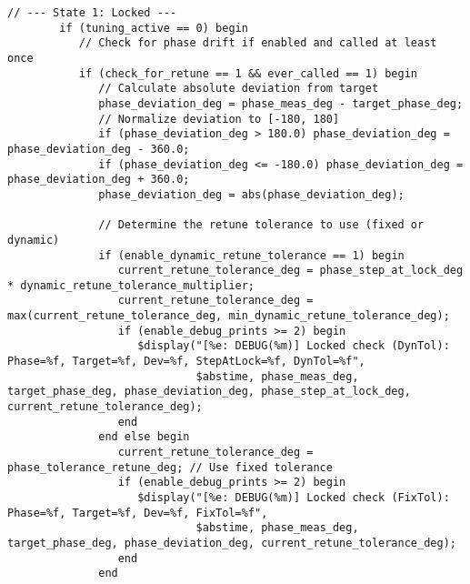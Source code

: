 \begin{lstlisting}[caption={Verilog-A Generic Vb Tuner Implementation}]
        // --- State 1: Locked ---
        if (tuning_active == 0) begin
           // Check for phase drift if enabled and called at least once
           if (check_for_retune == 1 && ever_called == 1) begin
              // Calculate absolute deviation from target
              phase_deviation_deg = phase_meas_deg - target_phase_deg;
              // Normalize deviation to [-180, 180]
              if (phase_deviation_deg > 180.0) phase_deviation_deg = phase_deviation_deg - 360.0;
              if (phase_deviation_deg <= -180.0) phase_deviation_deg = phase_deviation_deg + 360.0;
              phase_deviation_deg = abs(phase_deviation_deg);

              // Determine the retune tolerance to use (fixed or dynamic)
              if (enable_dynamic_retune_tolerance == 1) begin
                 current_retune_tolerance_deg = phase_step_at_lock_deg * dynamic_retune_tolerance_multiplier;
                 current_retune_tolerance_deg = max(current_retune_tolerance_deg, min_dynamic_retune_tolerance_deg);
                 if (enable_debug_prints >= 2) begin
                    $display("[%e: DEBUG(%m)] Locked check (DynTol): Phase=%f, Target=%f, Dev=%f, StepAtLock=%f, DynTol=%f",
                             $abstime, phase_meas_deg, target_phase_deg, phase_deviation_deg, phase_step_at_lock_deg, current_retune_tolerance_deg);
                 end
              end else begin
                 current_retune_tolerance_deg = phase_tolerance_retune_deg; // Use fixed tolerance
                 if (enable_debug_prints >= 2) begin
                    $display("[%e: DEBUG(%m)] Locked check (FixTol): Phase=%f, Target=%f, Dev=%f, FixTol=%f",
                             $abstime, phase_meas_deg, target_phase_deg, phase_deviation_deg, current_retune_tolerance_deg);
                 end
              end


\end{lstlisting}
